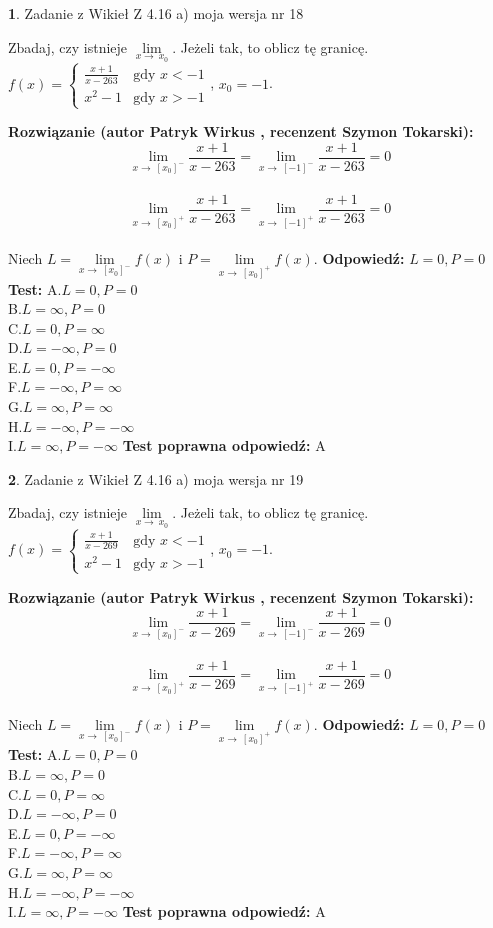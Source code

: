\documentclass[12pt, a4paper]{article}
\theoremstyle{definition} %
\newtheorem{zad}{}
\newcommand{\zadStart}[1]{\begin{zad}#1\newline}
\newcommand{\zadStop}{\end{zad}}
\newcommand{\rozwStart}[2]{\noindent \textbf{Rozwiązanie (autor #1 , recenzent #2): }\newline}
\newcommand{\rozwStop}{\newline}
\newcommand{\odpStart}{\noindent \textbf{Odpowiedź:}\newline}
\newcommand{\odpStop}{\newline}
\newcommand{\testStart}{\noindent \textbf{Test:}\newline}
\newcommand{\testStop}{\newline}
\newcommand{\kluczStart}{\noindent \textbf{Test poprawna odpowiedź:}\newline}
\newcommand{\kluczStop}{\newline}
\begin{document}
\zadStart{Zadanie z Wikieł Z 4.16 a) moja wersja nr 18}

Zbadaj, czy istnieje $\lim\limits_{x\to\ x_{0}}$. Jeżeli tak, to oblicz tę granicę.\\   $f(x) = \left\{ \begin{array}{ll}
\frac{x+1}{x-263} & \textrm{gdy $x<-1$}\\
x^{2}-1 & \textrm{gdy $x>-1$}
\end{array} \right.$, $x_{0}=-1$.
\zadStop
\rozwStart{Patryk Wirkus}{Szymon Tokarski}
$$\lim\limits_{x\to\ [x_{0}]^{-}}\frac{x+1}{x-263} = \lim\limits_{x\to\ [-1]^{-}}\frac{x+1}{x-263} = 0$$
\\
$$\lim\limits_{x\to\ [x_{0}]^{+}}\frac{x+1}{x-263} = \lim\limits_{x\to\ [-1]^{+}}\frac{x+1}{x-263} = 0$$
\\
Niech $L=\lim\limits_{x\to\ [x_{0}]^{-}}f(x)$ i $P=\lim\limits_{x\to\ [x_{0}]^{+}}f(x)$.
\rozwStop
\odpStart
$L=0, P=0$
\odpStop
\testStart
A.$L=0, P=0$\\ B.$L=\infty, P=0$\\ C.$L=0, P=\infty$\\ D.$L=-\infty, P=0$\\ E.$L=0, P=-\infty$\\
F.$L=-\infty, P=\infty$\\ G.$L=\infty, P=\infty$\\
H.$L=-\infty, P=-\infty$\\
I.$L=\infty, P=-\infty$
\testStop
\kluczStart
A
\kluczStop



\zadStart{Zadanie z Wikieł Z 4.16 a) moja wersja nr 19}

Zbadaj, czy istnieje $\lim\limits_{x\to\ x_{0}}$. Jeżeli tak, to oblicz tę granicę.\\   $f(x) = \left\{ \begin{array}{ll}
\frac{x+1}{x-269} & \textrm{gdy $x<-1$}\\
x^{2}-1 & \textrm{gdy $x>-1$}
\end{array} \right.$, $x_{0}=-1$.
\zadStop
\rozwStart{Patryk Wirkus}{Szymon Tokarski}
$$\lim\limits_{x\to\ [x_{0}]^{-}}\frac{x+1}{x-269} = \lim\limits_{x\to\ [-1]^{-}}\frac{x+1}{x-269} = 0$$
\\
$$\lim\limits_{x\to\ [x_{0}]^{+}}\frac{x+1}{x-269} = \lim\limits_{x\to\ [-1]^{+}}\frac{x+1}{x-269} = 0$$
\\
Niech $L=\lim\limits_{x\to\ [x_{0}]^{-}}f(x)$ i $P=\lim\limits_{x\to\ [x_{0}]^{+}}f(x)$.
\rozwStop
\odpStart
$L=0, P=0$
\odpStop
\testStart
A.$L=0, P=0$\\ B.$L=\infty, P=0$\\ C.$L=0, P=\infty$\\ D.$L=-\infty, P=0$\\ E.$L=0, P=-\infty$\\
F.$L=-\infty, P=\infty$\\ G.$L=\infty, P=\infty$\\
H.$L=-\infty, P=-\infty$\\
I.$L=\infty, P=-\infty$
\testStop
\kluczStart
A
\kluczStop
\end{document}
